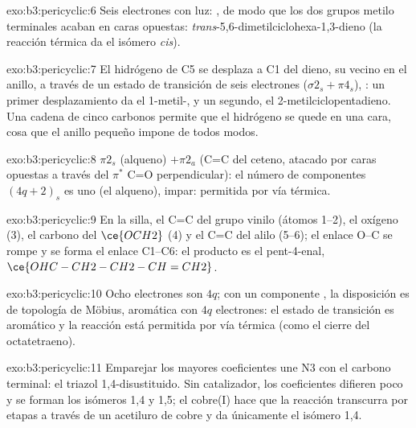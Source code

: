 \begin{solution}{exo:b3:pericyclic:6}
Seis electrones con luz: , de modo que los dos grupos metilo terminales acaban en
caras opuestas: \textit{trans}-5,6-dimetilciclohexa-1,3-dieno (la reacción térmica da
el isómero \textit{cis}).
\end{solution}

\begin{solution}{exo:b3:pericyclic:7}
El hidrógeno de C5 se desplaza a C1 del dieno, su vecino en el anillo,
a través de un estado de transición de seis electrones ($\sigma2_s + \pi4_s$), : un primer desplazamiento
da el 1-metil-, y un segundo, el 2-metilciclopentadieno. Una cadena de cinco carbonos permite que el
hidrógeno se quede en una cara, cosa que el anillo pequeño impone de todos modos.
\end{solution}

\begin{solution}{exo:b3:pericyclic:8}
$\pi2_s$ (alqueno) $+ \pi2_a$ (C=C del ceteno, atacado por caras opuestas a través del
$\pi^*$ C=O perpendicular): el número de componentes $(4q + 2)_s$ es uno (el alqueno), impar:
permitida por vía térmica.
\end{solution}

\begin{solution}{exo:b3:pericyclic:9}
En la silla, el C=C del grupo vinilo (átomos 1--2), el oxígeno (3), el carbono del $\ce{OCH2}$
(4) y el C=C del alilo (5--6); el enlace O--C se rompe y se forma el enlace C1--C6:
el producto es el pent-4-enal,
$\ce{OHC-CH2-CH2-CH=CH2}$.
\end{solution}

\begin{solution}{exo:b3:pericyclic:10}
Ocho electrones son $4q$; con un componente , la disposición es de topología de
Möbius, aromática con $4q$ electrones: el estado de transición es aromático y la
reacción está permitida por vía térmica (como el cierre  del octatetraeno).
\end{solution}

\begin{solution}{exo:b3:pericyclic:11}
Emparejar los mayores coeficientes une N3 con el carbono terminal: el
triazol 1,4-disustituido. Sin catalizador, los coeficientes difieren poco y
se forman los isómeros 1,4 y 1,5; el cobre(I) hace que la reacción transcurra por etapas a través de un
acetiluro de cobre y da únicamente el isómero 1,4.
\end{solution}

